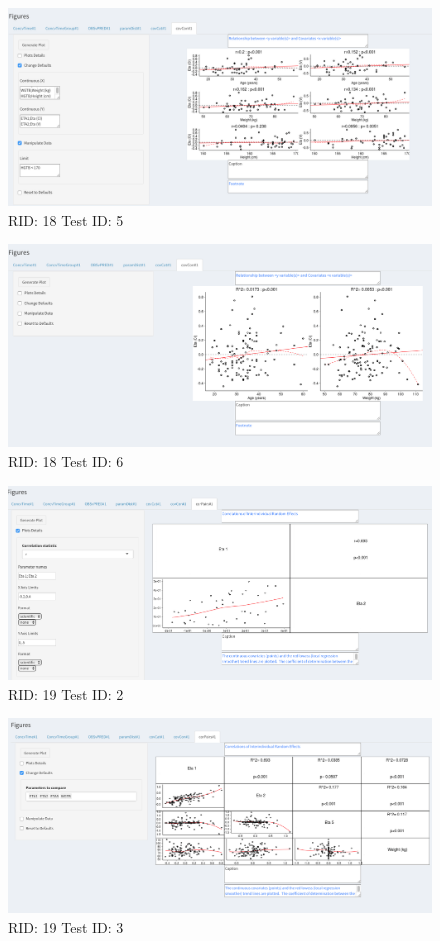 \begin{figure}[H]
\includegraphics[width=.8\textwidth]{screencaps/18-5-1.png}
\caption{RID: 18 Test ID: 5}
\end{figure}
\begin{figure}[H]
\includegraphics[width=.8\textwidth]{screencaps/18-6-1.png}
\caption{RID: 18 Test ID: 6}
\end{figure}
\begin{figure}[H]
\includegraphics[width=.8\textwidth]{screencaps/19-2-1.png}
\caption{RID: 19 Test ID: 2}
\end{figure}
\begin{figure}[H]
\includegraphics[width=.8\textwidth]{screencaps/19-3-1.png}
\caption{RID: 19 Test ID: 3}
\end{figure}

